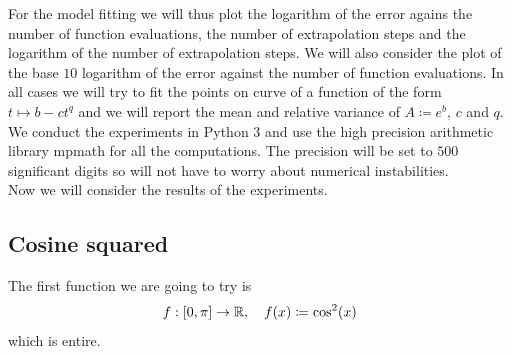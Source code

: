 For the model fitting we will thus plot the logarithm of the error agains the number of function evaluations, the number of extrapolation steps and the logarithm of the number of extrapolation steps. We will also consider the plot of the base \(10\) logarithm of the error against the number of function evaluations. In all cases we will try to fit the points on curve of a function of the form \(t\mapsto b - ct^q\) and we will report the mean and relative variance of \(A\coloneqq e^b\), \(c\) and \(q\).\\

We conduct the experiments in Python 3 and use the high precision arithmetic library mpmath for all the computations. The precision will be set to \(500\) significant digits so will not have to worry about numerical instabilities.\\

Now we will consider the results of the experiments.

\subsection{Cosine squared}
The first function we are going to try is
\[
f: [0, \pi]\rightarrow \mathbb{R}, \quad f(x) \coloneqq \cos^2(x)
\]
which is entire.

